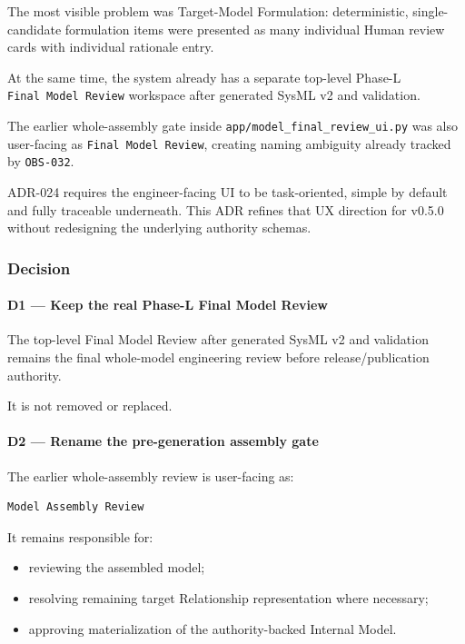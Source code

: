 The most visible problem was Target-Model Formulation: deterministic, single-candidate formulation items were presented as many individual Human review cards with individual rationale entry.

At the same time, the system already has a separate top-level Phase-L \texttt{Final\ Model\ Review} workspace after generated SysML v2 and validation.

The earlier whole-assembly gate inside \texttt{app/model\_final\_review\_ui.py} was also user-facing as \texttt{Final\ Model\ Review}, creating naming ambiguity already tracked by \texttt{OBS-032}.

ADR-024 requires the engineer-facing UI to be task-oriented, simple by default and fully traceable underneath. This ADR refines that UX direction for v0.5.0 without redesigning the underlying authority schemas.

\hypertarget{decision-21}{%
\subsubsection{Decision}\label{decision-21}}

\hypertarget{d1--keep-the-real-phase-l-final-model-review}{%
\paragraph{D1 --- Keep the real Phase-L Final Model Review}\label{d1--keep-the-real-phase-l-final-model-review}}

The top-level Final Model Review after generated SysML v2 and validation remains the final whole-model engineering review before release/publication authority.

It is not removed or replaced.

\hypertarget{d2--rename-the-pre-generation-assembly-gate}{%
\paragraph{D2 --- Rename the pre-generation assembly gate}\label{d2--rename-the-pre-generation-assembly-gate}}

The earlier whole-assembly review is user-facing as:

\begin{verbatim}
Model Assembly Review
\end{verbatim}

It remains responsible for:

\begin{itemize}
\tightlist
\item
  reviewing the assembled model;
\item
  resolving remaining target Relationship representation where necessary;
\item
  approving materialization of the authority-backed Internal Model.
\end{itemize}


